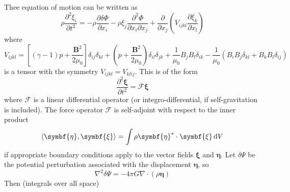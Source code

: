 \documentclass{jknotes}
\newcommand{\B}{\symbf{B}}
\newcommand{\disp}{\symbf{\xi}}
\begin{document}
Thee equation of motion can be written as
\begin{equation}
	\rho \frac{\partial^2 \xi_i}{\partial t^2} = -\rho \frac{\partial \delta
	\Phi}{\partial x_i} - \rho \xi_j \frac{\partial^2 \Phi}{\partial x_i
	\partial x_j} + \frac{\partial}{\partial x_j} \left( V_{ijkl} \frac{\partial
	\xi_k}{\partial x_l}\right)
\end{equation}
where
\begin{equation}
	V_{ijkl} = \left[ (\gamma -1)p + \frac{\B^2}{2\mu_0}\right] \delta_{ij}
	\delta_{kl} + \left( p + \frac{\B^2}{2\mu_0}\right) \delta_{il}
	\delta_{jk} + \frac{1}{\mu_0} B_j B_l \delta_{ik} - \frac{1}{\mu_0}(B_i
	B_j \delta_{kl} + B_k B_l \delta_{ij})
\end{equation}
is a tensor with the symmetry $V_{ijkl} = V_{klij}$. This is of the form
\begin{equation}
	\frac{\partial^2 \disp}{\partial t^2} = \mathcal{F} \disp \label{eq:l19:1}
\end{equation}
where $\mathcal{F}$ is a linear differential operator (or
integro-differential, if self-gravitation is included). The force operator
$\mathcal{F}$ is self-adjoint with respect to the inner product
\begin{equation}
	\langle \symbf{\eta}, \disp \rangle = \int \rho \symbf{\eta}^* \cdot \disp
	\, \diffd V
\end{equation}
if appropriate boundary conditions apply to the vector fields $\disp$ and
$\symbf{\eta}$. Let $\delta \Psi$ be the potential perturbation
associated with the displacement $\symbf{\eta}$, so
\begin{equation}
	\nabla^2 \delta \Psi = -4\pi G \nabla \cdot (\rho \symbf{\eta})
\end{equation}
Then (integrals over all space)
\end{document}
